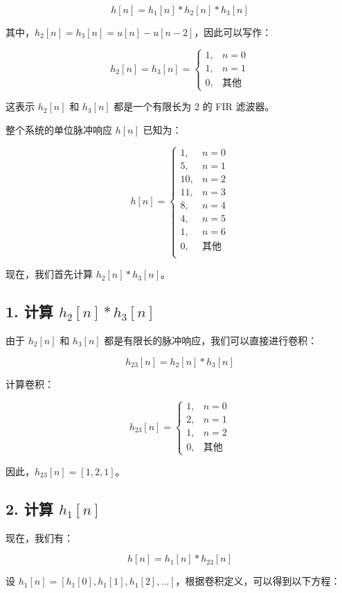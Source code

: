 \documentclass[UTF8]{report}
\theoremstyle{MyLineTheoremStyle} %
\theoremstyle{MyBlockTheoremStyle} %
\theoremstyle{MySubsubsectionStyle} %
\begin{document}
\[
h[n] = h_1[n] * h_2[n] * h_3[n]
\]

其中，$h_2[n] = h_3[n] = u[n] - u[n-2]$，因此可以写作：

\[
h_2[n] = h_3[n] = 
\begin{cases}
1, & n = 0 \\
1, & n = 1 \\
0, & \text{其他}
\end{cases}
\]

这表示 $h_2[n]$ 和 $h_3[n]$ 都是一个有限长为 2 的 FIR 滤波器。

整个系统的单位脉冲响应 $h[n]$ 已知为：

\[
h[n] = 
\begin{cases}
1, & n = 0 \\
5, & n = 1 \\
10, & n = 2 \\
11, & n = 3 \\
8, & n = 4 \\
4, & n = 5 \\
1, & n = 6 \\
0, & \text{其他} \\
\end{cases}
\]

现在，我们首先计算 $h_2[n] * h_3[n]$。

\subsection*{1. 计算 $h_2[n] * h_3[n]$}

由于 $h_2[n]$ 和 $h_3[n]$ 都是有限长的脉冲响应，我们可以直接进行卷积：

\[
h_{23}[n] = h_2[n] * h_3[n]
\]

计算卷积：

\[
h_{23}[n] = 
\begin{cases}
1, & n = 0 \\
2, & n = 1 \\
1, & n = 2 \\
0, & \text{其他}
\end{cases}
\]

因此，$h_{23}[n] = [1, 2, 1]$。

\subsection*{2. 计算 $h_1[n]$}

现在，我们有：

\[
h[n] = h_1[n] * h_{23}[n]
\]

设 $h_1[n] = [h_1[0], h_1[1], h_1[2], \dots]$，根据卷积定义，可以得到以下方程：
\end{document}
